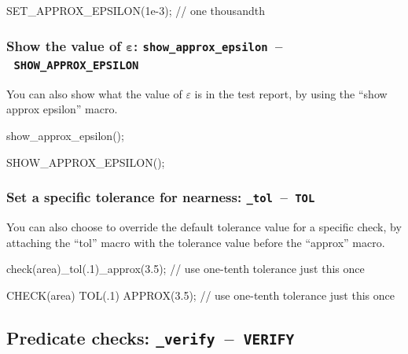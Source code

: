 \documentclass[twoside, a4paper, article]{memoir}
\newcommand*\testudocolor{\color{red!80!blue}}
\newcommand*\testudo[1]{\texttt{\testudocolor{}#1}}
\newcommand*\testudopair[2]{\testudo{#1}~--~\testudo{#2}}
\newcommand\subsectiontestudopair[3]{%
  \subsection[#1]{#1: \testudopair{#2}{#3}}}
\newcommand\subsubsectiontestudopair[3]{%
  \subsubsection[#1]{#1: \testudopair{#2}{#3}}}
\begin{document}
\begin{cpplisting}
SET_APPROX_EPSILON(1e-3); // one thousandth
\end{cpplisting}

\subsubsectiontestudopair{Show the value of $\bm{\varepsilon}$}%
  {show\_approx\_epsilon}{SHOW\_APPROX\_EPSILON}
\label{sec:show-value-epsilon}

You can also show what the value of $\varepsilon$ is in the test report, by
using the ``show approx epsilon'' macro.

\begin{cpplisting}
show_approx_epsilon();
\end{cpplisting}

\begin{cpplisting}
SHOW_APPROX_EPSILON();
\end{cpplisting}

\subsubsectiontestudopair{Set a specific tolerance for nearness}%
  {\_tol}{TOL}
\label{sec:specify-tolerance-nearness}

You can also choose to override the default tolerance value for a specific
check, by attaching the ``tol'' macro with the tolerance value before the
``approx'' macro.

\begin{cpplisting}
check(area)_tol(.1)_approx(3.5); // use one-tenth tolerance just this once
\end{cpplisting}

\begin{cpplisting}
CHECK(area) TOL(.1) APPROX(3.5); // use one-tenth tolerance just this once
\end{cpplisting}


\subsectiontestudopair{Predicate checks}{\_verify}{VERIFY}
\label{sec:predicate-checks}
\end{document}
